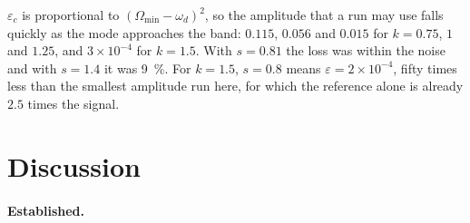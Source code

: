 \documentclass[11pt,a4paper]{article}
\begin{document}
$\varepsilon_c$ is proportional to $(\Omega_{\min}-\omega_d)^2$, so the amplitude that a run may use
falls quickly as the mode approaches the band: $0.115$, $0.056$ and $0.015$ for $k=0.75$, $1$
and $1.25$, and $3\times10^{-4}$ for $k=1.5$. With $s=0.81$ the loss was within the noise and with
$s=1.4$ it was \SI{9}{\%}. For $k=1.5$, $s=0.8$ means $\varepsilon=2\times10^{-4}$, fifty times less
than the smallest amplitude run here, for which the reference alone is already $2.5$ times the
signal.

\section{Discussion}
\label{sec:discusion}

\paragraph{Established.}
\end{document}

